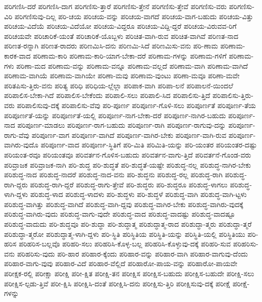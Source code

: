 {ಪರಿಗಣಿಸಿ-ದರೆ
ಪರಿಗಣಿಸಿ-ದಾಗ
ಪರಿಗಣಿಸು-ತ್ತಾರೆ
ಪರಿಗಣಿಸು-ತ್ತೇನೆ
ಪರಿಗಣಿಸು-ತ್ತೇವೆ
ಪರಿಗಣಿಸು-ವರು
ಪರಿಗಣಿಸು-ವಿರಿ
ಪರಿಗಣಿಸುವು-ದಿಲ್ಲ
ಪರಿ-ಚಯ
ಪರಿಚಯ-ವನ್ನು
ಪರಿಚಯ-ವಾಗದೆ
ಪರಿಚಯ-ವಾಗ-ಬಹುದು
ಪರಿಚಯ-ವಿತ್ತು
ಪರಿಚಯ-ವಿದೆಯೆ
ಪರಿಚಯ-ವಿದೆಯೋ
ಪರಿಚಯ-ವಿದ್ದರೂ
ಪರಿಚಯ-ವಿದ್ದಿ-ದ್ದರೆ
ಪರಿಚಯ-ವಿರುವವ-ರಿಗೆ
ಪರಿಚಯವೇ
ಪರಿಚಾರಿಕೆ-ಯಂತೆ
ಪರಿಚಾರಿಕೆ-ಯೊಬ್ಬಳು
ಪರಿಚಿತ-ವಾಗಿ-ರುವ
ಪರಿಚಿತ-ವಾಗಿವೆ
ಪರಿಣತ-ನಾದ
ಪರಿಣತ-ರನ್ನಾಗಿ
ಪರಿಣತ-ರಾದರು
ಪರಿಣಮಿಸಿ-ದನು
ಪರಿಣಮಿ-ಸಿದೆ
ಪರಿಣಮಿಸು-ವನು
ಪರಿ-ಣಾಮ
ಪರಿಣಾಮ-ಕಾರಕ-ವಾದ
ಪರಿಣಾಮ-ಕಾರಿ
ಪರಿಣಾಮ-ಕಾರಿ-ಯಾಗ-ಬೇಕಾ-ದರೆ
ಪರಿಣಾಮ-ಗಳನ್ನು
ಪರಿಣಾಮ-ಗಳಿಗೆ
ಪರಿಣಾಮ-ಗಳು
ಪರಿಣಾ-ಮದ
ಪರಿಣಾಮ-ವನ್ನು
ಪರಿಣಾಮ-ವನ್ನೂ
ಪರಿಣಾಮ-ವಲ್ಲದೆ
ಪರಿಣಾಮ-ವಾಗಿ
ಪರಿಣಾಮ-ವಾಗಿದೆ
ಪರಿಣಾಮ-ವಾಗಿಯೆ
ಪರಿಣಾಮ-ವಾಗಿಯೇ
ಪರಿಣಾ-ಮವು
ಪರಿಣಾಮ-ವುಂಟು
ಪರಿಣಾ-ಮವೂ
ಪರಿಣಾ-ಮವೇ
ಪರಿತಪಿಸು-ತ್ತಿರು-ವನು
ಪರಿತ್ಯ
ಪರಿಧಿ
ಪರಿಧಿಯ-ಲ್ಲೆಲ್ಲಾ
ಪರಿಪಾಕ-ವಾಗಿ
ಪರಿಪಾ-ಲನೆ
ಪರಿಪಾಲನೆ-ಯಿಂದಲೆ
ಪರಿಪಾಲಿಸ-ಬೇಕಾ-ಗಿದೆ
ಪರಿಪಾಲಿಸ-ಬೇಕೆಂದು
ಪರಿಪಾಲಿ-ಸಲು
ಪರಿಪಾಲಿ-ಸಿದ
ಪರಿಪಾಲಿಸು-ತ್ತಿದೆ
ಪರಿಪಾಲಿಸು-ತ್ತಿರು-ವರು
ಪರಿಪಾಲಿಸುವು-ದಕ್ಕೆ
ಪರಿಪಾಲಿಸು-ವೆವು
ಪರಿ-ಪೂರ್ಣ
ಪರಿಪೂರ್ಣ-ಗೊಳಿ-ಸಲು
ಪರಿಪೂರ್ಣತೆ
ಪರಿಪೂರ್ಣ-ತೆಯ
ಪರಿಪೂರ್ಣತೆ-ಯನ್ನು
ಪರಿಪೂರ್ಣತೆ-ಯಲ್ಲಿ
ಪರಿಪೂರ್ಣ-ನಾಗ-ಬೇಕಾ-ದರೆ
ಪರಿಪೂರ್ಣ-ನಾಗಿರ-ಬಹುದು
ಪರಿಪೂರ್ಣ-ನಾದ
ಪರಿಪೂರ್ಣ-ಮಾಡಲು
ಪರಿಪೂರ್ಣ-ರಾಗ-ಬಹುದು
ಪರಿಪೂರ್ಣ-ರಾಗಿ
ಪರಿಪೂರ್ಣ-ರಾಗುವು-ದನ್ನು
ಪರಿಪೂರ್ಣ-ರಾಗು-ವೆವು
ಪರಿಪೂರ್ಣ-ವಾಗ
ಪರಿಪೂರ್ಣ-ವಾಗಿದೆ
ಪರಿಪೂರ್ಣ-ವಾಗಿರ-ಬೇಕು
ಪರಿಪೂರ್ಣ-ವಾಗಿ-ರುವ
ಪರಿಪೂರ್ಣ-ವಾಗಿರು-ವುದೊ
ಪರಿಪೂರ್ಣ-ವಾದ
ಪರಿಪೂರ್ಣ-ಸ್ಥಿತಿಗೆ
ಪರಿ-ಮಿತಿ
ಪರಿಮಿತಿ-ಯನ್ನು
ಪರಿ-ಯಂತರ
ಪರಿಯಂತರ-ದಷ್ಟು
ಪರಿಯಂತ-ರವೂ
ಪರಿಯಂತವೂ
ಪರಿವರ್ತನ-ಗೊಳಿಸ-ಬಹುದು
ಪರಿವರ್ತನ-ವಾಗು-ತ್ತಿದೆ
ಪರಿವರ್ತನೆ-ಗೊಂಡ-ವರು
ಪರಿವ್ರಾಜಕ
ಪರಿವ್ರಾಜಕ-ನಾಗಿ
ಪರಿ-ಶುದ್ಧ
ಪರಿ-ಶುದ್ಧತೆ
ಪರಿ-ಶುದ್ಧತೆ-ಯಷ್ಟೇ
ಪರಿಶುದ್ಧ-ನಲ್ಲ
ಪರಿಶುದ್ಧ-ನಾಗಿರ-ಬೇಕು
ಪರಿಶುದ್ಧ-ನಾದ
ಪರಿಶುದ್ಧ-ನಾದರೆ
ಪರಿಶುದ್ಧ-ನಾದ-ವನು
ಪರಿ-ಶುದ್ಧನು
ಪರಿಶುದ್ಧ-ರಲ್ಲ
ಪರಿಶುದ್ಧ-ರಾಗಿ
ಪರಿಶುದ್ಧ-ರಾಗಿ-ದ್ದರು
ಪರಿಶುದ್ಧ-ರಾಗಿ-ದ್ದರೆ
ಪರಿಶುದ್ಧ-ರಾಗು-ತ್ತೇವೆ
ಪರಿ-ಶುದ್ಧರು
ಪರಿ-ಶುದ್ಧರೂ
ಪರಿಶುದ್ಧ-ಳಾಗಲು
ಪರಿಶುದ್ಧ-ಳಾಗಿ-ದ್ದಳು
ಪರಿಶುದ್ಧ-ಳಾದ
ಪರಿಶುದ್ಧ-ಳಾದಳು
ಪರಿ-ಶುದ್ಧಳು
ಪರಿ-ಶುದ್ಧಳೆ
ಪರಿಶುದ್ಧ-ವಾಗಿ
ಪರಿಶುದ್ಧ-ವಾಗಿ-ಟ್ಟಳು
ಪರಿಶುದ್ಧ-ವಾಗಿತ್ತು
ಪರಿಶುದ್ಧ-ವಾಗಿದೆ
ಪರಿಶುದ್ಧ-ವಾಗಿ-ದ್ದವು
ಪರಿಶುದ್ಧ-ವಾಗಿರ-ಬೇಕು
ಪರಿಶುದ್ಧ-ವಾಗಿರು-ವುದಕ್ಕೆ
ಪರಿಶುದ್ಧ-ವಾಗಿರು-ವುದು
ಪರಿಶುದ್ಧ-ವಾಗು-ವುದೇ
ಪರಿಶುದ್ಧ-ವಾದ
ಪರಿಶುದ್ಧ-ವಾದಷ್ಟು
ಪರಿಶುದ್ಧ-ವಾದಷ್ಟೂ
ಪರಿಶುದ್ಧ-ವಾದುದು
ಪರಿ-ಶುದ್ಧವೂ
ಪರಿ-ಶುದ್ಧಾ
ಪರಿ-ಶುದ್ಧಾತ್ಮ
ಪರಿಶುದ್ಧಾತ್ಮ-ರಾದ
ಪರಿಶುದ್ಧಾ-ತ್ಮರು
ಪರಿಶುದ್ಧಾ-ತ್ಮರೆ
ಪರಿಶುದ್ಧಾ-ತ್ಮರೋ
ಪರಿಶುದ್ಧಾತ್ಮ-ಳಾಗಿ-ದ್ದಳು
ಪರಿ-ಸ್ಥಿತಿ
ಪರಿಸ್ಥಿತಿಯ
ಪರಿಸ್ಥಿತಿ-ಯನ್ನು
ಪರಿಸ್ಥಿತಿ-ಯಲ್ಲಿ
ಪರಿಸ್ಥಿತಿಯು
ಪರಿ-ಹರಿಸ
ಪರಿಹರಿಸ-ಬಲ್ಲವೊ
ಪರಿಹರಿ-ಸಲು
ಪರಿಹರಿಸಿ-ಕೊಳ್ಳ-ಬಲ್ಲ
ಪರಿಹರಿಸಿ-ಕೊಳ್ಳುವು-ದಕ್ಕೆ
ಪರಿಹರಿ-ಸುವ
ಪರಿಹರಿಸು-ವನು
ಪರಿಹರಿಸು-ವುದು
ಪರಿ-ಹಾರ
ಪರಿಹಾರ-ಕ್ಕೆಂದು
ಪರಿಹಾರ-ವನ್ನು
ಪರಿಹಾರ-ವಾಗಿ
ಪರಿಹಾರ-ವಾಗುವು-ದೆಂದು
ಪರಿಹಾರ-ವಾಗು-ವುವು
ಪರಿಹಾರ-ವಿದೆ
ಪರಿಹಾರ-ವೆಲ್ಲಿದೆ
ಪರಿಹಾರೋ-ಪಾಯ-ವನ್ನು
ಪರಿಹಾರೋ-ಪಾಯವೇ
ಪರೀಕ್ಷಕ-ರಲ್ಲಿ
ಪರೀಕ್ಷಾ
ಪರೀಕ್ಷಿ
ಪರೀ-ಕ್ಷಿತ
ಪರೀಕ್ಷಿ-ತನ
ಪರೀಕ್ಷಿಸ
ಪರೀಕ್ಷಿಸ-ಬಹುದು
ಪರೀಕ್ಷಿಸ-ಬಹುದೇ
ಪರೀಕ್ಷಿ-ಸಲು
ಪರೀಕ್ಷಿಸ-ಲ್ಪಡು-ತ್ತಿವೆ
ಪರೀ-ಕ್ಷಿಸಿ
ಪರೀಕ್ಷಿಸಿ-ದಂತೆ
ಪರೀಕ್ಷಿಸಿ-ದನು
ಪರೀಕ್ಷಿಸು-ತ್ತಿರಿ
ಪರೀಕ್ಷಿಸುವು-ದಕ್ಕೆ
ಪರೀಕ್ಷೆ
ಪರೀಕ್ಷೆ-ಗಳನ್ನು
}
